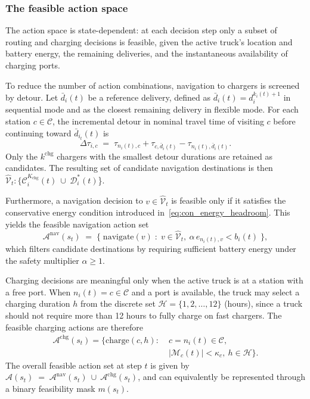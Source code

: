 \documentclass[journal]{IEEEtran}
\begin{document}
\subsubsection{The feasible action space}\label{sec:feasible_actions}

The action space is state-dependent: at each decision step only a subset of routing and charging decisions is feasible, given the active truck's location and battery energy, the remaining deliveries, and the instantaneous availability of charging ports. 

To reduce the number of action combinations, navigation to chargers is screened by detour. Let $\bar{d}_{i}(t)$ be a reference delivery, defined as $\bar{d}_{i}(t)=d_{i}^{k_{i}(t)+1}$ in sequential mode and as the closest remaining delivery in flexible mode. For each station $c\in\mathcal{C}$, the incremental detour in nominal travel time of visiting $c$ before continuing toward $\bar{d}_{i_t}(t)$ is
\begin{equation}
\Delta \tau _{i,c} \;=\;\tau_{n_{i}(t),c}+\tau_{c,\bar{d}_{i}(t)}-\tau_{n_{i}(t),\bar{d}_{i}(t)}.
\label{eq:charger_detour}
\end{equation}
Only the $k^{\mathrm{chg}}$ chargers with the smallest detour durations are retained as candidates.
The resulting set of candidate navigation destinations is then
$\hat{\mathcal{V}}_{t}:\{\mathcal{C}^{K_{\mathrm{chg}}}_{i}(t)\ \cup\ \mathcal{D}^{*}_{i}(t)$\}.

Furthermore, a navigation decision to $v\in\hat{\mathcal{V}}_{t}$ is feasible only if it satisfies the conservative energy condition introduced in~\eqref{eq:con_energy_headroom}. This yields the feasible navigation action set
\begin{equation}
\mathcal{A}^{\mathrm{nav}}(s_t)\;=\;\Big\{\;\text{navigate}(v)\;:\; v\in \hat{\mathcal{V}}_{t},\ \alpha\,e_{n_{i}(t),v}<b_{i}(t)\;\Big\},
\label{eq:feasible_nav}
\end{equation}
which filters candidate destinations by requiring sufficient battery energy under the safety multiplier $\alpha\ge 1$.

Charging decisions are meaningful only when the active truck is at a station with a free port. When $n_i(t)=c\in\mathcal{C}$ and a port is available, the truck may select a charging duration $h$ from the discrete set $\mathcal{H}=\{1,2,\ldots,12\}$ (hours), since a truck should not require more than 12 hours to fully charge on fast chargers. The feasible charging actions are therefore
\begin{equation}
\begin{split}
\mathcal{A}^{\mathrm{chg}}(s_t)=\big\{\text{charge}(c,h): \; & c=n_{i}(t)\in\mathcal{C},\\
& |\mathcal{M}_c(t)|<\kappa_c,\ h\in\mathcal{H}\big\}.
\end{split}
\label{eq:feasible_charge}
\end{equation}
The overall feasible action set at step $t$ is given by
$\mathcal{A}(s_t)\;=\;\mathcal{A}^{\mathrm{nav}}(s_t)\ \cup\ \mathcal{A}^{\mathrm{chg}}(s_t)$,
and can equivalently be represented through a binary feasibility mask $m(s_t)$.
\end{document}
